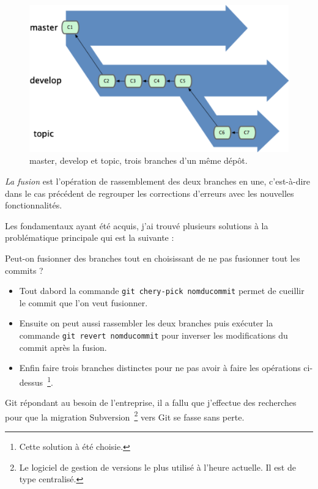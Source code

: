 \begin{figure}
\begin{center}
\includegraphics[scale=0.8]{images/branches.png}
\caption{master, develop et topic, trois branches d'un même dépôt.}
\label{branches:}
\end{center}
\end{figure}

\emph{La fusion} est l'opération de rassemblement des deux branches en une,
c'est-à-dire dans le cas précédent de regrouper les corrections d'erreurs avec
les nouvelles fonctionnalités.

Les fondamentaux ayant été acquis, j'ai trouvé plusieurs solutions à la
problématique principale qui est la suivante : \newline

Peut-on fusionner des branches tout en choisissant de ne pas fusionner
tout les commits ? \newline

\begin{itemize}
    \item Tout dabord la commande \texttt{git chery-pick nomducommit} permet
    de \og cueillir \fg{} le commit que l'on veut fusionner.
    \item Ensuite on peut aussi rassembler les deux branches puis exécuter la
    commande \texttt{git revert nomducommit} pour inverser les modifications
    du commit après la fusion.
    \item Enfin faire trois branches distinctes pour ne pas avoir à faire les
    opérations ci-dessus\, \footnote{Cette solution à été choisie.}.
\end{itemize}

Git répondant au besoin de l'entreprise, il a fallu que j'effectue des
recherches pour que la migration Subversion\, \footnote{Le logiciel de gestion
de versions le plus utilisé à l'heure actuelle. Il est de type centralisé.}
vers Git se fasse sans perte.

